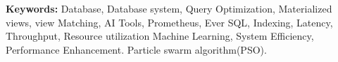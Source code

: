 
\noindent \textbf{Keywords:} Database, Database system, Query Optimization, Materialized views, view Matching, AI Tools, Prometheus, Ever SQL, Indexing, Latency, Throughput, Resource utilization Machine Learning, System Efficiency, Performance Enhancement. Particle swarm algorithm(PSO).

 

